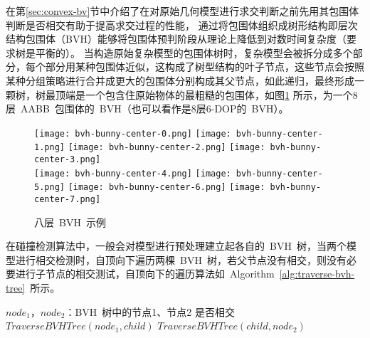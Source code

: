 在第\ref{sec:convex-bv}节中介绍了在对原始几何模型进行求交判断之前先用其包围体判断是否相交有助于提高求交过程的性能，
通过将包围体组织成树形结构即层次结构包围体（BVH）能够将包围体预判阶段从理论上降低到对数时间复杂度（要求树是平衡的）。
当构造原始复杂模型的包围体树时，复杂模型会被拆分成多个部分，每个部分用某种包围体近似，这构成了树型结构的叶子节点，这些节点会按照某种分组策略进行合并成更大的包围体分别构成其父节点，如此递归，最终形成一颗树，树最顶端是一个包含住原始物体的最粗糙的包围体，如图\ref{lbl:bvh-example}
所示，为一个8层~AABB~包围体的~BVH（也可以看作是8层6-DOP的~BVH）。
\begin{figure}[H]
  \centering
  \subcaptionbox*{\label{lbl:bvh-bunny-center-0.png}}
    {\texttt{[image: bvh-bunny-center-0.png]}}
  \subcaptionbox*{\label{lbl:bvh-bunny-center-1.png}}
    {\texttt{[image: bvh-bunny-center-1.png]}}
  \subcaptionbox*{\label{lbl:bvh-bunny-center-2.png}}
    {\texttt{[image: bvh-bunny-center-2.png]}}
  \subcaptionbox*{\label{lbl:bvh-bunny-center-3.png}}
    {\texttt{[image: bvh-bunny-center-3.png]}}
    \vspace{-0.3cm}
  \\\hspace{0.5cm} 
  \subcaptionbox*{\label{lbl:bvh-bunny-center-4.png}}
    {\texttt{[image: bvh-bunny-center-4.png]}}
  \subcaptionbox*{\label{lbl:bvh-bunny-center-5.png}}
    {\texttt{[image: bvh-bunny-center-5.png]}}
  \subcaptionbox*{\label{lbl:bvh-bunny-center-6.png}}
    {\texttt{[image: bvh-bunny-center-6.png]}}
  \subcaptionbox*{\label{lbl:bvh-bunny-center-7.png}}
    {\texttt{[image: bvh-bunny-center-7.png]}}
\caption{八层~BVH~示例}
\label{lbl:bvh-example}
\end{figure}

在碰撞检测算法中，一般会对模型进行预处理建立起各自的~BVH~树，当两个模型进行相交检测时，自顶向下遍历两棵~BVH~树，若父节点没有相交，则没有必要进行子节点的相交测试，自顶向下的遍历算法如~Algorithm~\ref{alg:traverse-bvh-tree}~所示。

\begin{algorithm}
\small
\caption{$TraverseBVHTree(node_1, node_2)$}
\label{alg:traverse-bvh-tree}
\begin{algorithmic}[1]
\REQUIRE
$node_1$，$node_2$：BVH~树中的节点1、节点2
\ENSURE
是否相交
    \RETURN \FALSE {}
\ELSE
         \ELSE
                \STATE $TraverseBVHTree(node_1, child)$ 
            \ENDFOR
         \ENDIF
    \ELSE
            \STATE $TraverseBVHTree(child, node_2)$  
         \ENDFOR
    \ENDIF
\ENDIF
\end{algorithmic}
\end{algorithm}

